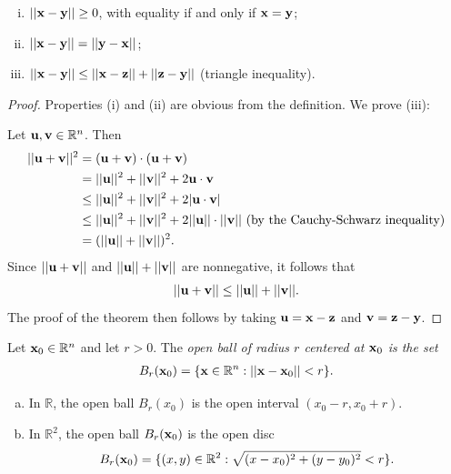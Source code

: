 \documentclass[12pt,letterpaper,reqno]{article}
\numberwithin{equation}{section}
\newcommand{\R}{\ensuremath{\mathbb R}}
\newcommand{\bu}{{\bf u}}
\newcommand{\bv}{{\bf v}}
\newcommand{\bx}{{\bf x}}
\newcommand{\by}{{\bf y}}
\newcommand{\bz}{{\bf z}}
\begin{document}
{\begin{thm}
	\begin{enumerate}[(i)]\hspace{15cm}
		\item $||\bx-\by||\geq 0$, with equality if and only if $\bx=\by$;
		\item $||\bx-\by||=||\by-\bx||$;
		\item $||\bx-\by||\leq ||\bx-\bz||+||\bz-\by||$ (triangle inequality).
	\end{enumerate}
\end{thm}

\begin{proof}
Properties (i) and (ii) are obvious from the definition. We prove (iii):

Let $\bu, \bv \in \R^n$. Then
\begin{align*}
	||\bu+\bv||^2&=(\bu+\bv)\cdot (\bu+\bv) \\
	&=||\bu||^2+||\bv||^2+2\bu \cdot \bv \\
	&\leq ||\bu||^2+||\bv||^2+2|\bu \cdot \bv| \\
	&\leq ||\bu||^2+||\bv||^2+2||\bu|| \cdot ||\bv|| \text{ (by the Cauchy-Schwarz inequality)} \\
	&=(||\bu||+||\bv||)^2.
\end{align*}	
Since $||\bu+\bv||$ and $||\bu||+||\bv||$ are nonnegative, it follows that
\begin{align*}
	||\bu+\bv|| \leq ||\bu||+||\bv||.
\end{align*}
The proof of the theorem then follows by taking $\bu=\bx-\bz$ and $\bv=\bz-\by$.
\end{proof}

\begin{defn}
	Let $\bx_0 \in \R^n$ and let $r>0$. The \emph{open ball of radius $r$ centered at $\bx_0$ is the set}	
	\begin{align*}
		B_r(\bx_0)=\{ \bx \in \R^n:||\bx-\bx_0||<r \}.
	\end{align*}	
\end{defn}

\begin{example}\hspace{15cm}
	\begin{enumerate}[(a)]
		\item In $\R$, the open ball $B_r(x_0)$ is the open interval $(x_0-r,x_0+r)$.
		\item In $\R^2$, the open ball $B_r(\bx_0)$ is the open disc
		\begin{align*}
			B_r(\bx_0)=\{(x,y) \in \R^2:\sqrt{(x-x_0)^2+(y-y_0)^2}<r\}.
		\end{align*}
	\end{enumerate}
\end{example}

}
\end{document}
